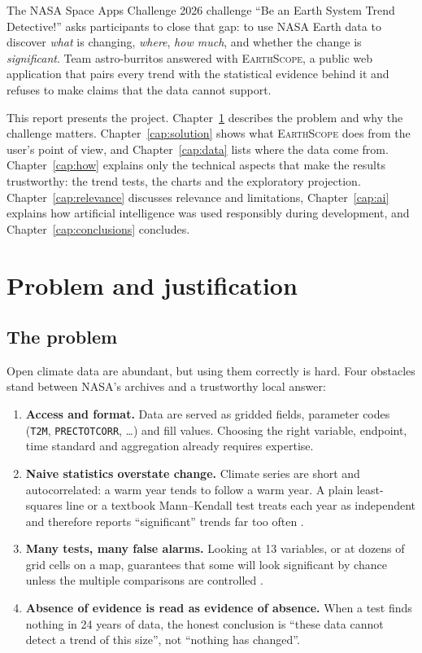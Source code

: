 \documentclass[12pt, oneside, openany]{report}
\newcommand{\EarthScope}{\textsc{EarthScope}}
\begin{document}
The NASA Space Apps Challenge 2026 challenge \enquote{Be an Earth System Trend Detective!} \cite{spaceapps2026} asks participants to close that gap: to use NASA Earth data to discover \emph{what} is changing, \emph{where}, \emph{how much}, and whether the change is \emph{significant}. Team astro-burritos answered with \EarthScope{}, a public web application that pairs every trend with the statistical evidence behind it and refuses to make claims that the data cannot support.

This report presents the project. Chapter~\ref{cap:problem} describes the problem and why the challenge matters. Chapter~\ref{cap:solution} shows what \EarthScope{} does from the user's point of view, and Chapter~\ref{cap:data} lists where the data come from. Chapter~\ref{cap:how} explains only the technical aspects that make the results trustworthy: the trend tests, the charts and the exploratory projection. Chapter~\ref{cap:relevance} discusses relevance and limitations, Chapter~\ref{cap:ai} explains how artificial intelligence was used responsibly during development, and Chapter~\ref{cap:conclusions} concludes.

\chapter{Problem and justification}\label{cap:problem}

\section{The problem}

Open climate data are abundant, but using them correctly is hard. Four obstacles stand between NASA's archives and a trustworthy local answer:

\begin{enumerate}[leftmargin=*]
    \item \textbf{Access and format.} Data are served as gridded fields, parameter codes (\texttt{T2M}, \texttt{PRECTOTCORR}, \ldots) and fill values. Choosing the right variable, endpoint, time standard and aggregation already requires expertise.
    \item \textbf{Naive statistics overstate change.} Climate series are short and autocorrelated: a warm year tends to follow a warm year. A plain least-squares line or a textbook Mann--Kendall test treats each year as independent and therefore reports \enquote{significant} trends far too often \cite{hamed1998,yue2002tfpw}.
    \item \textbf{Many tests, many false alarms.} Looking at 13 variables, or at dozens of grid cells on a map, guarantees that some will look significant by chance unless the multiple comparisons are controlled \cite{bh1995,wilks2016}.
    \item \textbf{Absence of evidence is read as evidence of absence.} When a test finds nothing in 24 years of data, the honest conclusion is \enquote{these data cannot detect a trend of this size}, not \enquote{nothing has changed}.
\end{enumerate}
\end{document}
